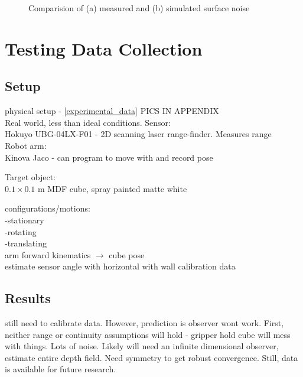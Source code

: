 \begin{figure}
{\begin{minipage}[b]{0.45\columnwidth}
 			\end{minipage}}
	  		\caption{Comparision of (a) measured and (b) simulated surface noise}
	  		\label{fig:surface_noise}
		\end{figure}

\section{Testing Data Collection} \label{testingdata}
	\subsection{Setup}
		physical setup - \ref{experimental_data} PICS IN APPENDIX\\
		Real world, less than ideal conditions.
		Sensor:\\
		Hokuyo UBG-04LX-F01 - 2D scanning laser range-finder. Measures range\\
		
		Robot arm: \\
		Kinova Jaco - can program to move with and record pose
		
		Target object: \\
		$0.1 \times 0.1$ m MDF cube, spray painted matte white
		
		configurations/motions: \\
			-stationary\\
			-rotating\\
			-translating\\					
		arm forward kinematics $\rightarrow$ cube pose\\
		estimate sensor angle with horizontal with wall calibration data		
		
	\subsection{Results}
		still need to calibrate data.
		However, prediction is observer wont work. First, neither range or continuity assumptions will hold - gripper hold cube will mess with things. Lots of noise.
		Likely will need an infinite dimensional observer, estimate entire depth field. Need symmetry to get robust convergence.
		Still, data is available for future research.

